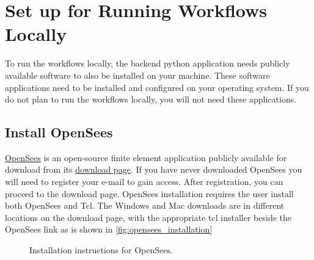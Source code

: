 \section{Set up for Running Workflows Locally}\label{setup}

To run the workflows locally, the backend python application needs publicly available software to also be installed on your machine. These software applications need to be installed and configured on your operating system. If you do not plan to run the workflows locally, you will not need these applications.

\subsection{Install OpenSees}

\href{https://opensees.berkeley.edu}{OpenSees} is an open-source finite element application publicly available for download from its \href{https://opensees.berkeley.edu/OpenSees/user/download.php}{download page}. If you have never downloaded OpenSees you will need to register your e-mail to gain access. After registration, you can proceed to the download page. OpenSees installation requires the user install both OpenSees and Tcl. The Windows and Mac downloads are in different locations on the download page, with the appropriate tcl installer beside the OpenSees link as is shown in \autoref{fig:opensees_installation}

\begin{figure}[!htbp]
  \caption{Installation instructions for OpenSees.}
  \label{fig:opensees_installation}
\end{figure}

